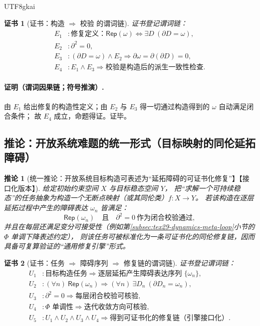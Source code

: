 \documentclass[12pt]{article}
\newtheorem{corollary}{推论}[section]
\newtheorem{Certificate}{证书}[section]
\newcommand{\KouJing}{\texorpdfstring{表述约定}{表述约定}}
\begin{document}
\begin{CJK*}{UTF8}{gkai}
\begin{Certificate}[证书：构造 $\Rightarrow$ 校验 的谓词链]
\label{cert:tex29-core-meta-edge-operator-positioning}
证书登记谓词链：
\[
\begin{aligned}
  E_1 &: \text{修复定义：}\mathsf{Rep}(\omega)\Longleftrightarrow \exists D\ (\partial D=\omega),\\
  E_2 &: \partial^2=0,\\
  E_3 &: (\partial D=\omega)\wedge E_2\Rightarrow \partial\omega=\partial(\partial D)=0,\\
  E_4 &: E_1\wedge E_3\Rightarrow \text{校验是构造后的派生一致性检查}.
\end{aligned}
\]
\end{Certificate}

\paragraph{证明（谓词因果链；符号推演）.}
由 $E_1$ 给出修复的构造性定义；由 $E_2$ 与 $E_3$ 得一切通过构造得到的 $\omega$ 自动满足闭合条件；
故 $E_4$ 成立，命题得证。证毕。

\subsection{推论：开放系统难题的统一形式（目标映射的同伦延拓障碍）}
\label{subsec:tex29-core-meta-open-systems}

\begin{corollary}[统一推论：开放系统目标构造可表述为“延拓障碍的可证书化修复”】【接口化版本】]
\label{cor:tex29-core-meta-open-systems}
给定初始约束空间 $X$ 与目标稳态空间 $Y$，
把“求解一个可持续稳态”的任务抽象为构造一个无断点映射（或其同伦类）$f:X\to Y$。
若该构造在逐层延拓过程中产生的障碍表达 $\omega_n$ 皆满足：
\[
  \mathsf{Rep}(\omega_n)\quad\text{且}\quad \partial^2=0\ \text{作为闭合校验通过},
\]
并且在每层还满足变分可接受性（例如第\ref{subsec:tex29-dynamics-meta-loop}小节的 $\Phi$ 单调下降\KouJing），
则该任务可被标准化为一条可证书化的同伦修复链，因而具备可复算验证的“通用修复引擎”形式。
\end{corollary}

\begin{Certificate}[证书：任务 $\Rightarrow$ 障碍序列 $\Rightarrow$ 修复链的谓词链]
\label{cert:tex29-core-meta-open-systems}
证书登记谓词链：
\[
\begin{aligned}
  U_1 &: \text{目标构造任务}\Rightarrow \text{逐层延拓产生障碍表达序列 }\{\omega_n\},\\
  U_2 &: (\forall n)\ \mathsf{Rep}(\omega_n)\Rightarrow (\forall n)\ \exists D_n\ (\partial D_n=\omega_n),\\
  U_3 &: \partial^2=0\Rightarrow \text{每层闭合校验可核验},\\
  U_4 &: \Phi\text{ 单调性}\Rightarrow \text{迭代收敛方向可核验},\\
  U_5 &: U_1\wedge U_2\wedge U_3\wedge U_4\Rightarrow \text{得到可证书化的修复链（引擎接口化）}.
\end{aligned}
\]
\end{Certificate}


\end{CJK*}
\end{document}
